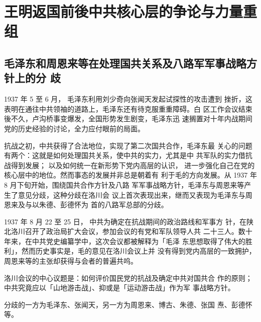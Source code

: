 \chapter{王明返国前後中共核心层的争论与力量重
组}

\section{毛泽东和周恩来等在处理国共关系及八路军军事战略方针上的分
歧}
1937 年 5 至 6 月，
毛泽东利用刘少奇向张闻天发起试探性的攻击遭到
挫折，这表明在通往中共领袖的道路上，毛泽东还有待克服重重障碍。白
区工作会议结束後不久，卢沟桥事变爆发，全国形势发生剧变，毛泽东迅
速搁置对十年内战期间党的历史经验的讨论，全力应付眼前的局面。

抗战之初，中共获得了合法地位，实现了第二次国共合作，毛泽东最
关心的问题有两个：这就是如何处理国共关系，使中共的实力，尤其是中
共军队的实力借抗战得到发展；
以及如何统一在新形势下党内高层的认识，
进一步强化自己在党的核心层中的地位。然而事态的发展并非总是朝着有
利于毛的方向发展。从 1937 年 8 月下旬开始，围绕国共合作方针及八路
军军事战略方针，毛泽东与周恩来等产生了意见分歧，这种分歧在洛川会
议上首次表现出来，继而又表现为毛泽东与周恩来及与以朱德、彭德怀为
首的八路军总部的分歧。

1937 年 8 月 22 至 25 日，
中共为确定在抗战期间的政治路线和军事方
针，在陕北洛川召开了政治局扩大会议，参加会议的有党和军队领导人共
二十三人。数十年来，在中共党史编纂学中，这次会议都被解释为「毛泽
东思想取得了伟大的胜利」，然而历史事实是，毛的意见在洛川会议上并
没有得到党内高层的一致拥护，
周恩来等的主张却获得与会者的普遍共呜。

洛川会议的中心议题是：如何评价国民党的抗战及确定中共对国共合
作的原则；中共究竟应以「山地游击战」、抑或是「运动游击战」作为军
事战略方针。

分歧的一方为毛泽东、张闻天，另一方为周恩来、博古、朱德、张国
焘、彭德怀等。


